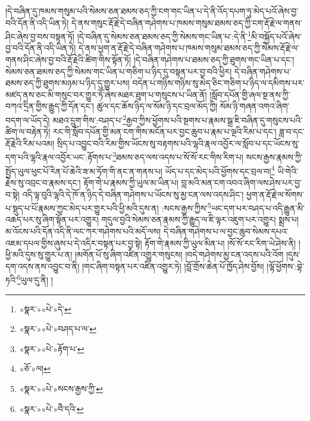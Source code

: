 །དེ་བཞིན་དུ་ཁམས་གསུམ་པའི་སེམས་ཅན་ཐམས་ཅད་ཀྱི་ངག་གང་ཡིན་པ་དེ་ནི་འོད་དཔག་ཏུ་མེད་པའོ་ཞེས་བྱ་བའི་དོན་ནི་འདི་ཡིན་ཏེ། དེ་ནས་གསུང་རྡོ་རྗེ་དེ་བཞིན་གཤེགས་པ་ཁམས་གསུམ་ཐམས་ཅད་ཀྱི་ངག་རྡོ་རྗེ་ལ་གནས་ཤིང་ཞེས་བྱ་བས་བསྟན་ཏོ། །དེ་བཞིན་དུ་སེམས་ཅན་ཐམས་ཅད་ཀྱི་སེམས་གང་ཡིན་པ་:དེ་ནི་\footnote{«སྣར་»«པེ་»དེ་}མི་བསྐྱོད་པའོ་ཞེས་བྱ་བའི་དོན་ནི་འདི་ཡིན་ཏེ། དེ་ནས་ཕྱག་ན་རྡོ་རྗེ་དེ་བཞིན་གཤེགས་པ་ཁམས་གསུམ་ཐམས་ཅད་ཀྱི་སེམས་རྡོ་རྗེ་ལ་གནས་ཤིང་ཞེས་བྱ་བའི་རྡོ་རྗེའི་ཚིག་གིས་སྟོན་ཏོ། །དེ་བཞིན་གཤེགས་པ་ཐམས་ཅད་ཀྱི་ཐུགས་གང་ཡིན་པ་དང་། སེམས་ཅན་ཐམས་ཅད་ཀྱི་སེམས་གང་ཡིན་པ་གཅིག་པ་ཉིད་དུ་བསྟན་པར་བྱ་བའི་ཕྱིར། དེ་བཞིན་གཤེགས་པ་ཐམས་ཅད་ཀྱི་ཐུགས་མཉམ་པ་ཉིད་དུ་གྱུར་པས། བདེན་པ་གཉིས་གཉིས་སུ་མེད་ཅིང་གཅིག་པ་ཉིད་ལ་དམིགས་པར་མཛད་ནས་ཅང་མི་གསུང་བར་གྱུར་ཏོ་ཞེས་མཐར་ཐུག་པ་གསུངས་པ་ཡིན་ནོ། །སློབ་དཔོན་གྱི་ཞལ་སྔ་ནས་ཀྱི་བཀའ་དྲིན་གྱིས་རྒྱུད་ཀྱི་དོན་དང་། ཚུལ་དང་ཆོས་ཉིད་ལ་སོམ་ཉི་དང་བྲལ་མོད་ཀྱི། སོམ་ཉི་གཞན་འགའ་ཞིག་བདག་ལ་ཡོད་དེ། མཐའ་དྲུག་གིས་:བཤད་པ་\footnote{«སྣར་»«པེ་»བཤད་པ་ལ་}རྒྱབ་ཀྱིས་ཕྱོགས་པའི་སྔགས་པ་རྣམས་སྒྲ་ཇི་བཞིན་དུ་གསུངས་པའི་ཚིག་ལ་བརྟེན་ཏེ། རང་གི་སློབ་དཔོན་གྱི་མན་ངག་གིས་མངོན་པར་བྱང་ཆུབ་པ་རྣམ་པ་ལྔའི་རིམ་པ་དང་། ཟླ་བ་དང་རྡོ་རྗེའི་རིམ་པའམ། སྲིད་པ་འབྱུང་བའི་རིམ་གྱིས་ཡོངས་སུ་བརྟགས་པའི་ལྷའི་རྣལ་འབྱོར་ལ་སློབ་པ་དང་ཡོངས་སུ་དག་པའི་ལྷའི་རྣལ་འབྱོར་ཡང་:རྟོགས་པ་\footnote{«སྣར་»«པེ་»རྟོག་པ་}ཐམས་ཅད་ལས་འདས་པ་སོ་སོ་རང་གིས་རིག་པ། སངས་རྒྱས་རྣམས་ཀྱི་སྤྱོད་ཡུལ་ཕུང་པོ་རིན་པོ་ཆེའི་ཟ་མ་ཏོག་གི་ནང་ན་གནས་པ། ཡོད་པ་དང་མེད་པའི་ཕྱོགས་དང་བྲལ་བ།\footnote{«ཅོ་»ལ།} ཡི་གེའི་རྗེས་སུ་འབྲང་བ་རྣམས་དང་། རྟོག་གེ་པ་རྣམས་ཀྱི་ཡུལ་མ་ཡིན་པ། བླ་མའི་མན་ངག་འབའ་ཞིག་ལས་ཤེས་པར་བྱ་བ་སྟེ། འདི་ལྟ་བུའི་ལྷའི་དེ་ཁོ་ན་ཉིད་དེ་བཞིན་གཤེགས་པ་ཡོངས་སུ་མྱ་ངན་ལས་འདས་ཤིང་། ཕྱག་ན་རྡོ་རྗེ་ལ་སོགས་པ་སྡུད་པ་པོ་རྣམས་ཀྱང་མེད་པར་གྱུར་པའི་ཕྱི་མའི་དུས་ན། :སངས་རྒྱས་ཀྱིས་\footnote{«སྣར་»«པེ་»སངས་རྒྱས་ཀྱི་}ཡང་དག་པར་བཤད་པ་འདི་རྒྱུན་མི་འཆད་པར་སུ་ཞིག་སྟོན་པར་འགྱུར། གདུལ་བྱའི་སེམས་ཅན་རྣམས་ཀྱི་རྒྱུད་ལ་ཇི་ལྟར་འཇུག་པར་འགྱུར། སྨྲས་པ། མ་འོངས་པའི་དོན་འདི་ནི་ལང་ཀར་གཤེགས་པའི་མདོ་ལས། དེ་བཞིན་གཤེགས་པ་ལ་བྱང་ཆུབ་སེམས་དཔའ་འཇམ་དཔལ་གྱིས་ཞུས་པ་དེ་འདིར་བསྟན་པར་བྱ་སྟེ། རྟོག་གེ་རྣམས་ཀྱི་ཡུལ་མིན་པ། །སོ་སོ་རང་རིག་ཡེ་ཤེས་ནི། །ཕྱི་མའི་དུས་སུ་གྱུར་པ་ན། །མགོན་པོ་སུ་ཞིག་འཛིན་འགྱུར་གསུངས། །བདེ་གཤེགས་མྱ་ངན་འདས་པའི་འོག །དུས་དག་འདས་ནས་འབྱུང་བ་ནི། །གང་ཞིག་བསྟན་པར་འཛིན་འགྱུར་ཏེ། །བློ་གྲོས་ཆེན་པོ་ཁྱོད་ཤེས་བྱོས། །ལྷོ་ཕྱོགས་:བྷེ་ཏའི་\footnote{«སྣར་»«པེ་»བཻ་དའི་}ཡུལ་དུ་ནི། །
